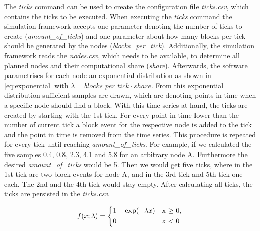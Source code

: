 The \textit{ticks} command can be used to create the configuration file \textit{ticks.csv}, which contains the ticks to be executed.
When executing the \textit{ticks} command the simulation framework accepts one parameter denoting the number of ticks to create (\textit{amount\_of\_ticks}) and one parameter about how many blocks per tick should be generated by the nodes (\textit{blocks\_per\_tick}).
Additionally, the simulation framework reads the \textit{nodes.csv}, which needs to be available, to determine all planned nodes and their computational share (\textit{share}).
Afterwards, the software parametrises for each node an exponential distribution as shown in \ref{eq:exponential} with $\lambda = blocks\_per\_tick \cdot share$.
From this exponential distribution sufficient samples are drawn, which are denoting points in time when a specific node should find a block.
With this time series at hand, the ticks are created by starting with the 1st tick.
For every point in time lower than the number of current tick a block event for the respective node is added to the tick and the point in time is removed from the time series.
This procedure is repeated for every tick until reaching \textit{amount\_of\_ticks}.
For example, if we calculated the five samples 0.4, 0.8, 2.3, 4.1 and 5.8 for an arbitrary node A.
Furthermore the desired \textit{amount\_of\_ticks} would be 5.
Then we would get five ticks, where in the 1st tick are two block events for node A, and in the 3rd tick  and 5th tick one each.
The 2nd and the 4th tick would stay empty. After calculating all ticks, the ticks are persisted in the \textit{ticks.csv}.

 \begin{equation} \label{eq:exponential}
f(x; \lambda) = \begin{cases*}
        1 - \exp(-\lambda x) & x  $\geq$ 0, \\
        0                                    &  x < 0
        \end{cases*}
\end{equation}

